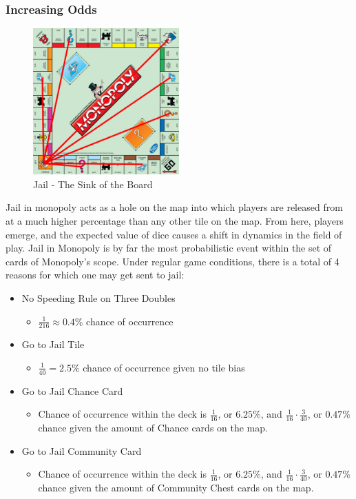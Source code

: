 \documentclass[12pt]{article}
\begin{document}
\subsubsection{Increasing Odds}
\label{Jail Probabilities}
\begin{figure}[h]
\centering
\includegraphics[width=0.5\textwidth]{jail.jpg}
\caption{Jail - The Sink of the Board}
\end{figure}
Jail in monopoly acts as a hole on the map into which players are released from at a much higher percentage than any other tile on the map. From here, players emerge, and the expected value of dice causes a shift in dynamics in the field of play. Jail in Monopoly is by far the most probabilistic event within the set of cards of Monopoly's scope. Under regular game conditions, there is a total of 4 reasons for which one may get sent to jail:
\begin{itemize}
  \item {No Speeding Rule on Three Doubles}
  \begin{itemize}
  \item $\frac{1}{216}\approx0.4\%$ chance of occurrence
  \end{itemize}
  \item {Go to Jail Tile}
  \begin{itemize}
  \item $\frac{1}{40}=2.5\%$ chance of occurrence given no tile bias
  \end{itemize}
  \item {Go to Jail Chance Card}
  \begin{itemize}
  \item Chance of occurrence within the deck is $\frac{1}{16}$, or $6.25\%$, and $\frac{1}{16} \cdot \frac{3}{40}$, or $0.47\%$ chance given the amount of Chance cards on the map.
  \end{itemize}
  \item {Go to Jail Community Card}
  \begin{itemize}
  \item Chance of occurrence within the deck is $\frac{1}{16}$, or $6.25\%$, and $\frac{1}{16} \cdot \frac{3}{40}$, or $0.47\%$ chance given the amount of Community Chest cards on the map.
  \end{itemize}
\end{itemize}
\end{document}

